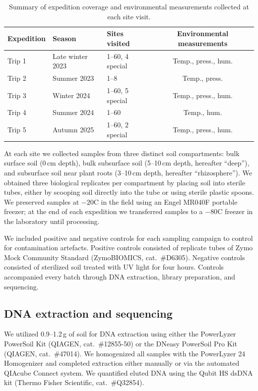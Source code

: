 \documentclass[11pt,a4paper]{article}
\begin{document}
\begin{table}[h]
  \centering
  \caption{Summary of expedition coverage and environmental
    measurements collected at each site visit.}
  \label{tab:env_summary}
  \begin{tabular}{lllc}
    \toprule
    Expedition & Season & Sites visited & Environmental measurements \\
    \midrule
    Trip 1 & Late winter 2023 & 1--60, 4 special & Temp., press., hum. \\
    Trip 2 & Summer 2023      & 1--8             & Temp., press. \\
    Trip 3 & Winter 2024      & 1--60, 5 special & Temp., press., hum. \\
    Trip 4 & Summer 2024      & 1--60            & Temp., hum. \\
    Trip 5 & Autumn 2025      & 1--60, 2 special & Temp., press., hum. \\
    \bottomrule
  \end{tabular}
\end{table}

At each site we collected samples from three distinct soil
compartments: bulk surface soil (0\,cm depth), bulk subsurface soil
(5--10\,cm depth, hereafter ``deep''), and subsurface soil near plant
roots (3--10\,cm depth, hereafter ``rhizosphere''). We obtained three
biological replicates per compartment by placing soil into sterile
tubes, either by scooping soil directly into the tube or using sterile
plastic spoons. We preserved samples at $-20$\degree C in the field
using an Engel MR040F portable freezer; at the end of each expedition
we transferred samples to a $-80$\degree C freezer in the laboratory
until processing.

We included positive and negative controls for each sampling
campaign to control for contamination artefacts. Positive controls
consisted of replicate tubes of Zymo Mock Community Standard
(ZymoBIOMICS, cat.~\#D6305). Negative controls consisted of sterilized
soil treated with UV light for four hours. Controls accompanied every
batch through DNA extraction, library preparation, and sequencing.

\subsection{DNA extraction and sequencing}

We utilized 0.9--1.2\,g of soil for DNA extraction using either the
PowerLyzer PowerSoil Kit (QIAGEN, cat.~\#12855-50) or the DNeasy
PowerSoil Pro Kit (QIAGEN, cat.~\#47014). We homogenized all samples
with the PowerLyzer 24 Homogenizer and completed extraction either
manually or via the automated QIAcube Connect system. We quantified
eluted DNA using the Qubit HS dsDNA kit (Thermo Fisher
Scientific, cat.~\#Q32854).
\end{document}
